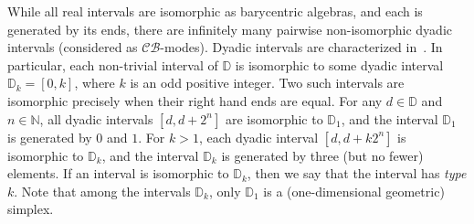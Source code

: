 \documentclass[12pt]{amsart}
\def\mbD{\mathbb{D}}
\newcommand{\mc}{\mathcal}
\theoremstyle{plain}
\theoremstyle{definition}
\numberwithin{equation}{section}
\begin{document}
While all real intervals are isomorphic as barycentric algebras, and each is generated by
its ends, there are infinitely many pairwise non-isomorphic dyadic intervals (considered as
$\mc{CB}$-modes). Dyadic intervals are characterized in~\cite{MRS11}. In particular,
each non-trivial interval of $\mbD$ is isomorphic to some dyadic interval $\mbD_k = [0,k]$,
where $k$ is an odd positive integer. Two such intervals are isomorphic precisely when their
right hand ends are equal.
For any $d \in \mbD$ and $n\in\mathbb N$, all dyadic intervals $[d,d+2^{n}]$ are isomorphic to $\mbD_1$, and the interval $\mbD_{1}$ is generated by $0$ and $1$. For $k > 1$, each dyadic interval $[d,d+k2^{n}]$ is isomorphic to $\mbD_k$, and the interval $\mbD_{k}$ is generated by three (but no fewer) elements. If an interval is isomorphic to $\mbD_k$, then we say that the interval has \emph{type} $k$. Note that among the intervals $\mbD_k$, only $\mbD_1$ is a (one-dimensional geometric) simplex.
\end{document}
